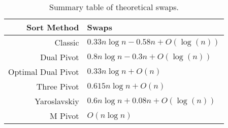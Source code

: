 		\begin{table}
			\begin{center}
				\begin{tabular}{|r|l|}
					\hline
					Sort Method         &     Swaps \\ \hline \hline
					Classic             &  $0.33n \log n - 0.58n + O(\log(n))$\\ \hline
					Dual Pivot          &  $0.8n \log n -0.3n + O(\log(n))$   \\ \hline
					Optimal Dual Pivot  &  $0.33n \log n + O(n)$              \\ \hline
					Three Pivot         &  $0.615n \log n + O(n)$             \\ \hline
					Yaroslavskiy        &  $0.6n \log n + 0.08n + O(\log(n))$  \\ \hline
					M Pivot             &  $O(n \log n)$ \\ 
					\hline
				\end{tabular}
				\caption{Summary table of theoretical swaps.}
				\label{tab:SwapSummary}
			\end{center}
		\end{table}